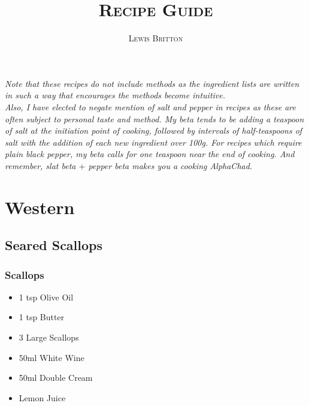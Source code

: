 \documentclass[11pt, english]{article}
\begin{document}

	\title{\huge\textsc{Recipe Guide}}
	\author{\Large\textsc{Lewis Britton}}
	\date{}
	\maketitle

	\textit{Note that these recipes do not include methods as the ingredient lists are written in such a way that encourages the methods become intuitive.}\\

	\textit{Also, I have elected to negate mention of salt and pepper in recipes as these are often subject to personal taste and method. My beta tends to be adding a teaspoon of salt at the initiation point of cooking, followed by intervals of half-teaspoons of salt with the addition of each new ingredient over 100g. For recipes which require plain black pepper, my beta calls for one teaspoon near the end of cooking. And remember, slat beta $+$ pepper beta makes you a cooking AlphaChad.}

	\renewcommand{\contentsname}{Table of Contents}

	\tableofcontents

\newpage


\section{Western}

	\subsection{Seared Scallops}

		\subsubsection*{Scallops}

	\begin{itemize}
	\setlength\itemsep{0cm}
		\item 1 tsp Olive Oil
		\item 1 tsp Butter
		\item 3 Large Scallops
		\item 50ml White Wine
		\item 50ml Double Cream
		\item Lemon Juice
	\end{itemize}
\end{document}
